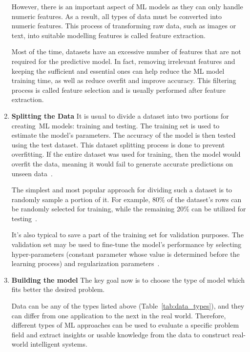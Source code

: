 \begin{enumerate}
    However, there is an important aspect of \gls{ML} models as they can only handle numeric features. As a result, all types of data must be converted into numeric features. This process of transforming raw data, such as images or text, into suitable modelling features is called feature extraction.
    
    Most of the time, datasets have an excessive number of features that are not required for the predictive model. In fact, removing irrelevant features and keeping the sufficient and essential ones can help reduce the \gls{ML} model training time, as well as reduce overfit and improve accuracy. This filtering process is called feature selection and is usually performed after feature extraction.
    
    \item \textbf{Splitting the Data} It is usual to divide a dataset into two portions for creating \gls{ML} models: training and testing. The training set is used to estimate the model's parameters. The accuracy of the model is then tested using the test dataset. This dataset splitting process is done to prevent overfitting. If the entire dataset was used for training, then the model would overfit the data, meaning it would fail to generate accurate predictions on unseen data~\cite{Joseph2020SPlit:Splitting}.
    
    The simplest and most popular approach for dividing such a dataset is to randomly sample a portion of it. For example, 80\% of the dataset's rows can be randomly selected for training, while the remaining 20\% can be utilized for testing~\cite{Joseph2020SPlit:Splitting}.
    
    It's also typical to save a part of the training set for validation purposes. The validation set may be used to fine-tune the model's performance by selecting hyper-parameters (constant parameter whose value is determined before the learning process) and regularization parameters~\cite{Joseph2020SPlit:Splitting}.
    
    \item \textbf{Building the model} The key goal now is to choose the type of model which fits better the desired problem.
    
    Data can be any of the types listed above (Table~\ref{tab:data_types}), and they can differ from one application to the next in the real world. Therefore, different types of \gls{ML} approaches can be used to evaluate a specific problem field and extract insights or usable knowledge from the data to construct real-world intelligent systems.
    

\end{enumerate}
